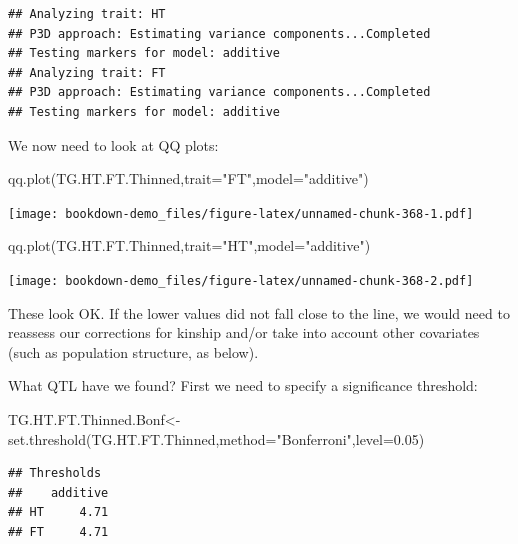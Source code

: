 \documentclass[
]{book}
\newenvironment{Shaded}{\begin{snugshade}}{\end{snugshade}}
\newcommand{\AttributeTok}[1]{\textcolor[rgb]{0.77,0.63,0.00}{#1}}
\newcommand{\FloatTok}[1]{\textcolor[rgb]{0.00,0.00,0.81}{#1}}
\newcommand{\FunctionTok}[1]{\textcolor[rgb]{0.00,0.00,0.00}{#1}}
\newcommand{\NormalTok}[1]{#1}
\newcommand{\OtherTok}[1]{\textcolor[rgb]{0.56,0.35,0.01}{#1}}
\newcommand{\StringTok}[1]{\textcolor[rgb]{0.31,0.60,0.02}{#1}}
\begin{document}
\begin{verbatim}
## Analyzing trait: HT 
## P3D approach: Estimating variance components...Completed 
## Testing markers for model: additive 
## Analyzing trait: FT 
## P3D approach: Estimating variance components...Completed 
## Testing markers for model: additive
\end{verbatim}

We now need to look at QQ plots:

\begin{Shaded}
\begin{Highlighting}[]
\FunctionTok{qq.plot}\NormalTok{(TG.HT.FT.Thinned,}\AttributeTok{trait=}\StringTok{"FT"}\NormalTok{,}\AttributeTok{model=}\StringTok{"additive"}\NormalTok{)}
\end{Highlighting}
\end{Shaded}

\texttt{[image: bookdown-demo\_files/figure-latex/unnamed-chunk-368-1.pdf]}

\begin{Shaded}
\begin{Highlighting}[]
\FunctionTok{qq.plot}\NormalTok{(TG.HT.FT.Thinned,}\AttributeTok{trait=}\StringTok{"HT"}\NormalTok{,}\AttributeTok{model=}\StringTok{"additive"}\NormalTok{)}
\end{Highlighting}
\end{Shaded}

\texttt{[image: bookdown-demo\_files/figure-latex/unnamed-chunk-368-2.pdf]}

These look OK. If the lower values did not fall close to the line, we would need to reassess our corrections for kinship and/or take into account other covariates (such as population structure, as below).

What QTL have we found? First we need to specify a significance threshold:

\begin{Shaded}
\begin{Highlighting}[]
\NormalTok{TG.HT.FT.Thinned.Bonf}\OtherTok{\textless{}{-}}\FunctionTok{set.threshold}\NormalTok{(TG.HT.FT.Thinned,}\AttributeTok{method=}\StringTok{"Bonferroni"}\NormalTok{,}\AttributeTok{level=}\FloatTok{0.05}\NormalTok{)}
\end{Highlighting}
\end{Shaded}

\begin{verbatim}
## Thresholds
##    additive
## HT     4.71
## FT     4.71
\end{verbatim}
\end{document}
